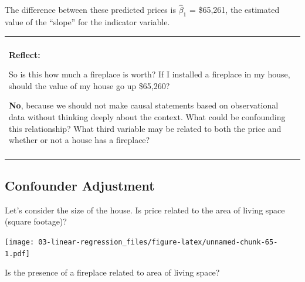 \documentclass[
]{book}
\newenvironment{Shaded}{\begin{snugshade}}{\end{snugshade}}
\newcommand{\DataTypeTok}[1]{\textcolor[rgb]{0.13,0.29,0.53}{#1}}
\newcommand{\KeywordTok}[1]{\textcolor[rgb]{0.13,0.29,0.53}{\textbf{#1}}}
\newcommand{\NormalTok}[1]{#1}
\newcommand{\OperatorTok}[1]{\textcolor[rgb]{0.81,0.36,0.00}{\textbf{#1}}}
\newcommand{\StringTok}[1]{\textcolor[rgb]{0.31,0.60,0.02}{#1}}
\newenvironment{reflect}
{
    \begin{center}
    
    \begin{tabular}{|p{0.8\textwidth}|}
    \rowcolor{LightBlue}
    \hline\\
    \rowcolor{LightBlue}
    \textbf{Reflect:}
}
{
    \\\rowcolor{LightBlue}
    \\\hline
    \end{tabular} 
    \end{center}
}
\begin{document}
The difference between these predicted prices is \(\hat{\beta}_1\) = \$65,261, the estimated value of the ``slope'' for the indicator variable.

\begin{reflect}
So is this how much a fireplace is worth? If I installed a fireplace in
my house, should the value of my house go up \$65,260?

\textbf{No}, because we should not make causal statements based on
observational data without thinking deeply about the context. What could
be confounding this relationship? What third variable may be related to
both the price and whether or not a house has a fireplace?
\end{reflect}

\hypertarget{confounder-adjustment}{%
\subsection{Confounder Adjustment}\label{confounder-adjustment}}

Let's consider the size of the house. Is price related to the area of living space (square footage)?

\begin{Shaded}
\end{Shaded}

\texttt{[image: 03-linear-regression\_files/figure-latex/unnamed-chunk-65-1.pdf]}

Is the presence of a fireplace related to area of living space?

\begin{Shaded}
\end{Shaded}
\end{document}
